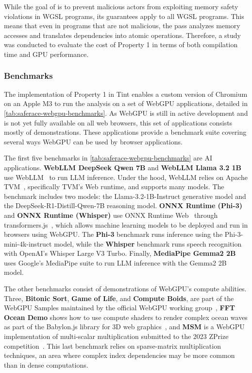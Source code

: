 While the goal of \smsg is to prevent malicious actors from exploiting memory safety violations in WGSL programs, its guarantees apply to all WGSL programs. This means that even in programs that are not malicious, the \smsg pass analyzes memory accesses and translates dependencies into atomic operations. Therefore, a study was conducted to evaluate the cost of \smsg Property 1 in terms of both compilation time and GPU performance.

\subsubsection{Benchmarks}

The implementation of Property 1 in Tint enables a custom version of Chromium on an Apple M3 to run the analysis on a set of WebGPU applications, detailed in \mytab\ref{tab:saferace-webgpu-benchmarks}. As WebGPU is still in active development and is not yet fully available on all web browsers, this set of applications consists mostly of demonstrations. These applications provide a benchmark suite covering several ways WebGPU can be used by browser applications.

The first five benchmarks in \mytab\ref{tab:saferace-webgpu-benchmarks} are AI applications. \textbf{WebLLM DeepSeek Qwen 7B} and \textbf{WebLLM Llama 3.2 1B} use WebLLM~\cite{ruan2024webllmhighperformanceinbrowserllm} to run LLM inference. Under the hood, WebLLM relies on Apache TVM~\cite{apache_tvm}, specifically TVM's Web runtime, and supports many models. The benchmark includes two models: the Llama-3.2-1B-Instruct generative model and the DeepSeek-R1-Distill-Qwen-7B reasoning model. \textbf{ONNX Runtime (Phi-3)} and \textbf{ONNX Runtime (Whisper)} use ONNX Runtime Web~\cite{onnxruntime_webgpu_tutorial} through transformers.js~\cite{transformersjsDocs}, which allows machine learning models to be deployed and run in browsers using WebGPU. The \textbf{Phi-3} benchmark runs inference using the Phi-3-mini-4k-instruct model, while the \textbf{Whisper} benchmark runs speech recognition with OpenAI's Whisper Large V3 Turbo. Finally, \textbf{MediaPipe Gemma2 2B} uses Google's MediaPipe suite to run LLM inference with the Gemma2 2B model.

The other benchmarks consist of demonstrations of WebGPU's compute abilities. Three, \textbf{Bitonic Sort}, \textbf{Game of Life}, and \textbf{Compute Boids}, are part of the WebGPU Samples maintained by the official WebGPU working group~\cite{WebGPUSamples}, \textbf{FFT Ocean Demo} shows how to use compute shaders to render complex ocean waves as part of the Babylon.js library for 3D web graphics~\cite{FFTOceanDemo}, and \textbf{MSM} is a WebGPU implementation of multi-scalar multiplication submitted to the 2023 ZPrize competition~\cite{ZPrize2025}. This last benchmark relies on sparse-matrix multiplication techniques, an area where complex index dependencies may be more common than in dense computations.

